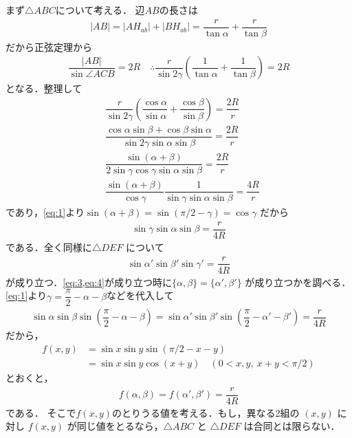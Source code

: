 \documentclass[../../main.tex]{subfiles}
\begin{document}
まず$\triangle ABC$について考える．
辺$AB$の長さは
\begin{align}
  |AB| = |AH_{ab}| + |BH_{ab}| = \dfrac{r}{\tan \alpha} + \dfrac{r}{\tan \beta}
\end{align}
だから正弦定理から
\begin{align}
  \dfrac{|AB|}{\sin \angle ACB} = 2R
  \quad \therefore
  \dfrac{r}{\sin 2\gamma} \left( \dfrac{1}{\tan \alpha} + \dfrac{1}{\tan \beta} \right) = 2R
\end{align}
となる．整理して
\begin{align}
  & \dfrac{r}{\sin 2\gamma} \left( \dfrac{\cos \alpha}{\sin \alpha} + \dfrac{\cos \beta }{\sin \beta} \right) = \dfrac{2R}{r} \\
  & \dfrac{\cos\alpha\sin\beta + \cos\beta\sin\alpha }{\sin 2\gamma \sin \alpha \sin \beta } = \dfrac{2R}{r} \\
  & \dfrac{\sin(\alpha+\beta)}{2 \sin\gamma\cos\gamma \sin \alpha \sin \beta } = \dfrac{2R}{r} \\
  & \dfrac{\sin(\alpha+\beta)}{\cos\gamma}\dfrac{1}{\sin\gamma \sin \alpha \sin \beta } = \dfrac{4R}{r}
\end{align}
であり，\cref{eq:1}より$\sin(\alpha+\beta) = \sin(\pi/2-\gamma) = \cos \gamma$ だから
\begin{align}
  \sin\gamma \sin \alpha \sin \beta = \dfrac{r}{4R} \label{eq:3}
\end{align}
である．全く同様に$\triangle DEF$ について
\begin{align}
  \sin \alpha' \sin \beta' \sin \gamma' = \dfrac{r}{4R} \label{eq:4}
\end{align}
が成り立つ．\cref{eq:3,eq:4}が成り立つ時に$\{\alpha, \beta\} = \{\alpha', \beta'\}$ が成り立つかを調べる．\cref{eq:1}より$\gamma=\dfrac{\pi}{2}-\alpha-\beta$などを代入して
\begin{align}
  \sin \alpha \sin \beta \sin\left(\dfrac{\pi}{2}-\alpha-\beta\right)
  =\sin \alpha' \sin \beta' \sin\left(\dfrac{\pi}{2}-\alpha'-\beta'\right)
  =\dfrac{r}{4R}
\end{align}
だから，
\begin{align}
  f(x, y)
  &= \sin x \sin y \sin(\pi/2 - x - y) \\
  &= \sin x \sin y \cos(x+y) \quad (0 < x, y, \ x+y < \pi/2) \label{eq:5}
\end{align}
とおくと，
\begin{align}
  f(\alpha,\beta) = f(\alpha',\beta') = \dfrac{r}{4R} \label{eq:6}
\end{align}
である．
そこで$f(x,y)$のとりうる値を考える．もし，異なる2組の $(x,y)$ に対し $f(x,y)$ が同じ値をとるなら，$\triangle ABC$ と $\triangle DEF$ は合同とは限らない．
\end{document}
